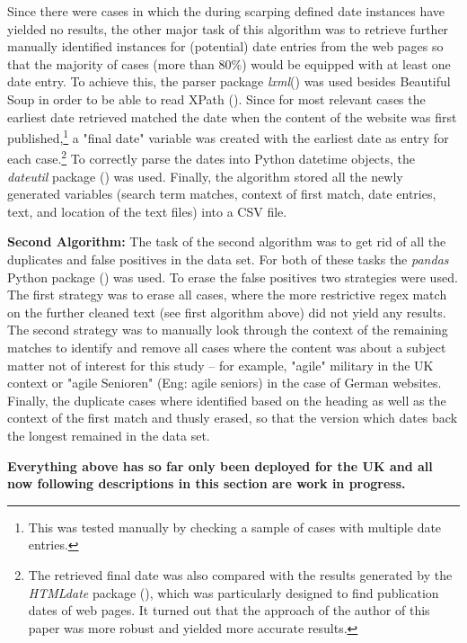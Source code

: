 Since there were cases in which the during scarping defined date instances have yielded no results, the other major task of this algorithm was to retrieve further manually identified instances for (potential) date entries from the web pages so that the majority of cases (more than 80\%) would be equipped with at least one date entry. To achieve this, the parser package \textit{lxml}(\cite{Faassen2006}) was used besides Beautiful Soup in order to be able to read XPath (\cite{Clark1999}). Since for most relevant cases the earliest date retrieved matched the date when the content of the website was first published,\footnote{This was tested manually by checking a sample of cases with multiple date entries.} a "final date" variable was created with the earliest date as entry for each case.\footnote{The retrieved final date was also compared with the results generated by the \textit{HTMLdate} package (\cite{Barbaresi2020}), which was particularly designed to find publication dates of web pages. It turned out that the approach of the author of this paper was more robust and yielded more accurate results.} To correctly parse the dates into Python datetime objects, the \textit{dateutil} package (\cite{Niemeyer2003}) was used. Finally, the algorithm stored all the newly generated variables (search term matches, context of first match, date entries, text, and location of the text files) into a CSV file.\par
\textbf{Second Algorithm:} The task of the second algorithm was to get rid of all the duplicates and false positives in the data set. For both of these tasks the \textit{pandas} Python package (\cite{McKinney2010}) was used. To erase the false positives two strategies were used. The first strategy was to erase all cases, where the more restrictive regex match on the further cleaned text (see first algorithm above) did not yield any results. The second strategy was to manually look through the context of the remaining matches to identify and remove all cases where the content was about a subject matter not of interest for this study – for example, "agile" military in the UK context or "agile Senioren" (Eng: agile seniors) in the case of German websites. Finally, the duplicate cases where identified based on the heading as well as the context of the first match and thusly erased, so that the version which dates back the longest remained in the data set.\par 
%
\vspace{3pt}
\begin{center}
    \textbf{Everything above has so far only been deployed for the UK and all now following descriptions in this section are work in progress.}
\end{center}

